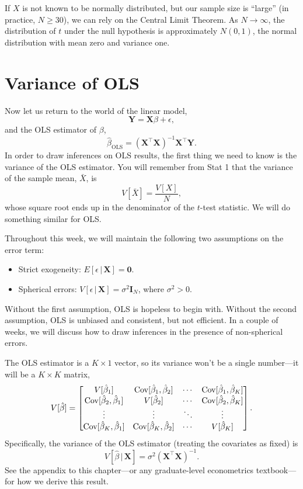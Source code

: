 \documentclass[
  12pt,
  oneside,openany]{book}
\begin{document}
If \(X\) is not known to be normally distributed, but our sample size is ``large'' (in practice, \(N \geq 30\)), we can rely on the Central Limit Theorem. As \(N \to \infty\), the distribution of \(t\) under the null hypothesis is approximately \(N(0, 1)\), the normal distribution with mean zero and variance one.

\hypertarget{variance-of-ols}{%
\section{Variance of OLS}\label{variance-of-ols}}

Now let us return to the world of the linear model,
\[
\mathbf{Y} = \mathbf{X} \beta + \epsilon,
\]
and the OLS estimator of \(\beta\),
\[
\hat{\beta}_{\text{OLS}} = (\mathbf{X}^\top \mathbf{X})^{-1} \mathbf{X}^\top \mathbf{Y}.
\]
In order to draw inferences on OLS results, the first thing we need to know is the variance of the OLS estimator. You will remember from Stat 1 that the variance of the sample mean, \(\bar{X}\), is
\[
V[\bar{X}] = \frac{V[X]}{N},
\]
whose square root ends up in the denominator of the \(t\)-test statistic. We will do something similar for OLS.

Throughout this week, we will maintain the following two assumptions on the error term:

\begin{itemize}
\item
  Strict exogeneity: \(E[\epsilon \,|\, \mathbf{X}] = \mathbf{0}\).
\item
  Spherical errors: \(V[\epsilon \,|\, \mathbf{X}] = \sigma^2 \mathbf{I}_N\), where \(\sigma^2 > 0\).
\end{itemize}

Without the first assumption, OLS is hopeless to begin with. Without the second assumption, OLS is unbiased and consistent, but not efficient. In a couple of weeks, we will discuss how to draw inferences in the presence of non-spherical errors.

The OLS estimator is a \(K \times 1\) vector, so its variance won't be a single number---it will be a \(K \times K\) matrix,
\[
V[\hat{\beta}] = \begin{bmatrix}
  V[\hat{\beta}_1] & \mathop{\rm Cov}\nolimits[\hat{\beta}_1, \hat{\beta}_2] & \cdots & \mathop{\rm Cov}\nolimits[\hat{\beta}_1, \hat{\beta}_K] \\
  \mathop{\rm Cov}\nolimits[\hat{\beta}_2, \hat{\beta}_1] & V[\hat{\beta}_2] & \cdots & \mathop{\rm Cov}\nolimits[\hat{\beta}_2, \hat{\beta}_K] \\
  \vdots & \vdots & \ddots & \vdots \\
  \mathop{\rm Cov}\nolimits[\hat{\beta}_K, \hat{\beta}_1] & \mathop{\rm Cov}\nolimits[\hat{\beta}_K, \hat{\beta}_2] & \cdots & V[\hat{\beta}_K] \\
\end{bmatrix}.
\]
Specifically, the variance of the OLS estimator (treating the covariates as fixed) is
\[
V[\hat{\beta} \,|\, \mathbf{X}] = \sigma^2 (\mathbf{X}^\top \mathbf{X})^{-1}.
\]
See the appendix to this chapter---or any graduate-level econometrics textbook---for how we derive this result.
\end{document}
